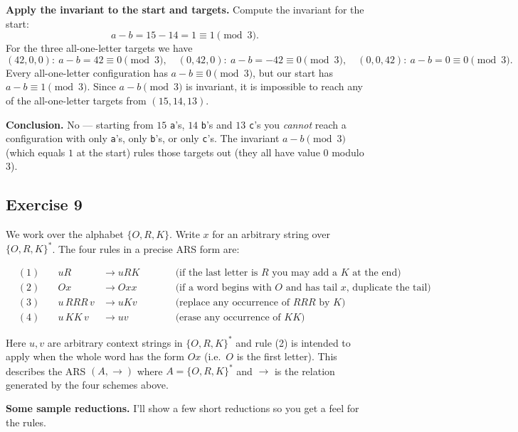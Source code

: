 \documentclass[12pt]{article}
\begin{document}
\bigskip

\textbf{Apply the invariant to the start and targets.}  
Compute the invariant for the start:
\[
a-b = 15-14 = 1 \equiv 1 \pmod{3}.
\]
For the three all-one-letter targets we have
\[
(42,0,0):\ a-b=42\equiv 0\pmod{3},\quad
(0,42,0):\ a-b=-42\equiv 0\pmod{3},\quad
(0,0,42):\ a-b=0\equiv 0\pmod{3}.
\]
Every all-one-letter configuration has \(a-b\equiv 0\pmod{3}\), but our start has \(a-b\equiv 1\pmod{3}\). Since \(a-b\pmod{3}\) is invariant, it is impossible to reach any of the all-one-letter targets from \((15,14,13)\).

\bigskip

\textbf{Conclusion.}  
No — starting from \(15\) \texttt{a}'s, \(14\) \texttt{b}'s and \(13\) \texttt{c}'s you \emph{cannot} reach a configuration with only \texttt{a}'s, only \texttt{b}'s, or only \texttt{c}'s. The invariant \(a-b\pmod{3}\) (which equals \(1\) at the start) rules those targets out (they all have value \(0\) modulo \(3\)).

\subsection*{Exercise 9}

We work over the alphabet \(\{O,R,K\}\).  
Write \(x\) for an arbitrary string over \(\{O,R,K\}^*\). The four rules in a precise ARS form are:

\[
\begin{aligned}
&(1)\quad &uR &\longrightarrow uRK &\qquad&\text{(if the last letter is \(R\) you may add a \(K\) at the end)}\\
&(2)\quad &Ox &\longrightarrow Oxx &\qquad&\text{(if a word begins with \(O\) and has tail \(x\), duplicate the tail)}\\
&(3)\quad &u\,RRR\,v &\longrightarrow uKv &\qquad&\text{(replace any occurrence of \(RRR\) by \(K\))}\\
&(4)\quad &u\,KK\,v &\longrightarrow u v &\qquad&\text{(erase any occurrence of \(KK\))}
\end{aligned}
\]

Here \(u,v\) are arbitrary context strings in \(\{O,R,K\}^*\) and rule (2) is intended to apply when the whole word has the form \(Ox\) (i.e.\ \(O\) is the first letter). This describes the ARS \((A,\to)\) where \(A=\{O,R,K\}^*\) and \(\to\) is the relation generated by the four schemes above.

\bigskip

\textbf{Some sample reductions.}  
I'll show a few short reductions so you get a feel for the rules.
\end{document}
